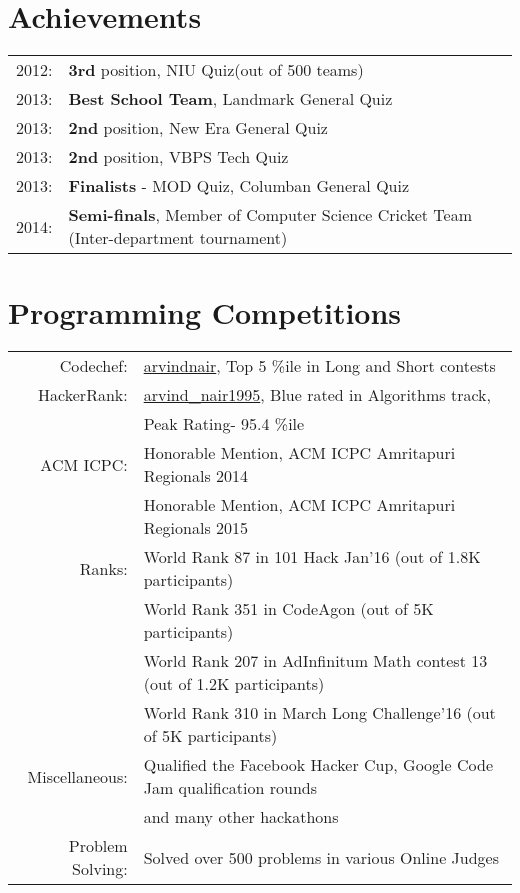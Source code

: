 \documentclass[margin,line]{res}
\begin{document}
\begin{resume}
\section{\sc Achievements}

\begin{tabular}{rl}
2012: &{\bf 3rd} position, NIU Quiz(out of 500 teams) \\
2013: &{\bf Best School Team}, Landmark General Quiz \\
2013: &{\bf 2nd} position, New Era General Quiz \\
2013: &{\bf 2nd} position, VBPS Tech Quiz \\
2013: &{\bf Finalists} - MOD Quiz, Columban General Quiz \\ 
2014: &{\bf Semi-finals}, Member of Computer Science Cricket Team (Inter-department tournament) \\
 
\end{tabular}


\section{\sc Programming Competitions}

\begin{tabular}{rl}
Codechef: & \href{http://www.codechef.com/users/arvindnair}{arvindnair}, Top 5 \%ile in Long and Short contests \\
HackerRank: &\href{https://www.hackerrank.com/arvind_nair1995}{arvind\_nair1995}, Blue rated in Algorithms track, \\
& Peak Rating- 95.4 \%ile \\
ACM ICPC: & Honorable Mention, ACM ICPC Amritapuri Regionals 2014 \\
& Honorable Mention, ACM ICPC Amritapuri Regionals 2015 \\
Ranks: &World Rank 87 in 101 Hack Jan'16 (out of 1.8K participants) \\
&World Rank 351 in CodeAgon (out of 5K participants) \\
&World Rank 207 in AdInfinitum Math contest 13 (out of 1.2K participants) \\
&World Rank 310 in March Long Challenge'16 (out of 5K participants) \\
Miscellaneous: &Qualified the Facebook Hacker Cup, Google Code Jam qualification rounds\\
& and many other hackathons \\
Problem Solving: & Solved over 500 problems in various Online Judges \\


\end{tabular}
\end{resume}
\end{document}
